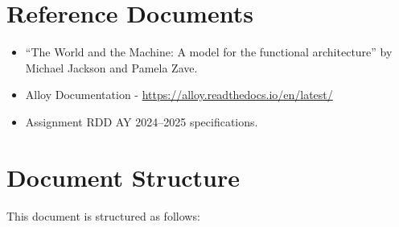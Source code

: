 \section{Reference Documents}\label{sec:reference}
\begin{itemize}
    \item ``The World and the Machine: A model for the functional architecture'' by Michael Jackson and Pamela Zave.
    \item Alloy Documentation - \url{https://alloy.readthedocs.io/en/latest/}
    \item Assignment RDD AY 2024–2025 specifications.
\end{itemize}

\section{Document Structure}\label{sec:structure}
This document is structured as follows:
